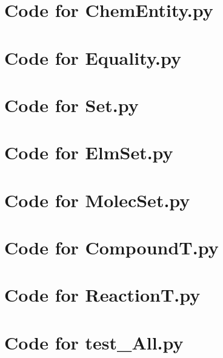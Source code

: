 \documentclass[12pt]{article}
\begin{document}
\section{Code for ChemEntity.py}

\noindent 

\newpage

\section{Code for Equality.py}

\noindent 

\newpage

\section{Code for Set.py}

\noindent 

\newpage

\section{Code for ElmSet.py}

\noindent 

\newpage

\section{Code for MolecSet.py}

\noindent 

\newpage

\section{Code for CompoundT.py}

\noindent 

\newpage

\section{Code for ReactionT.py}

\noindent 

\newpage

\section{Code for test\_All.py}
\end{document}
